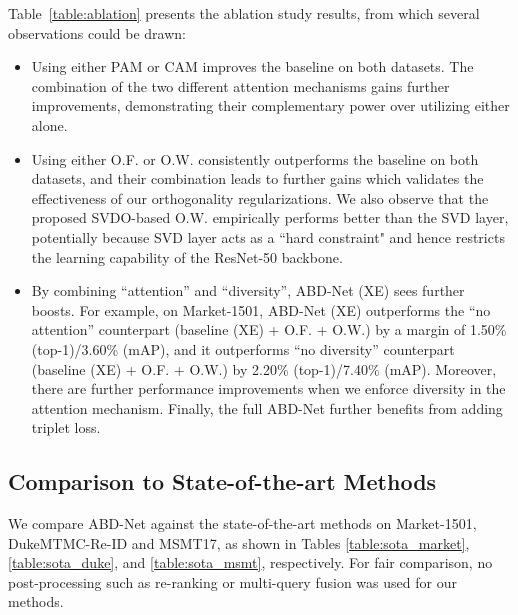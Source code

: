 \documentclass[10pt,twocolumn]{article}
\begin{document}
Table~\ref{table:ablation} presents the ablation study results, from which several observations could be drawn:
\begin{itemize}
    \item Using either PAM or CAM improves the baseline on both datasets. The combination of the two different attention mechanisms gains further improvements, demonstrating their complementary power over utilizing either alone.
    
    \item Using either O.F. or O.W. consistently outperforms the baseline on both datasets, and their combination leads to further gains which validates the effectiveness of our orthogonality regularizations. We also observe that the proposed SVDO-based O.W. empirically performs better than the SVD layer, 
potentially because SVD layer acts as a ``hard constraint" and hence restricts the learning capability of the ResNet-50 backbone.
    \item By combining ``attention'' and ``diversity'', ABD-Net (XE) sees further boosts. For example, on Market-1501, ABD-Net (XE) outperforms the ``no attention'' counterpart (baseline (XE) + O.F. + O.W.) by a margin of 1.50\% (top-1)/3.60\% (mAP), and it outperforms ``no diversity'' counterpart (baseline (XE) + O.F. + O.W.) by 2.20\% (top-1)/7.40\% (mAP). Moreover, there are further performance improvements when we enforce diversity in the attention mechanism. 
Finally, the full ABD-Net further benefits from adding triplet loss.
\end{itemize}










\subsection{Comparison to State-of-the-art Methods}
We compare ABD-Net against the state-of-the-art methods on Market-1501, DukeMTMC-Re-ID and MSMT17, as shown in Tables \ref{table:sota_market}, \ref{table:sota_duke}, and \ref{table:sota_msmt}, respectively. For fair comparison, no post-processing such as re-ranking \cite{zhong2017re} or multi-query fusion \cite{zheng2015scalable} was used for our methods. 
\end{document}
